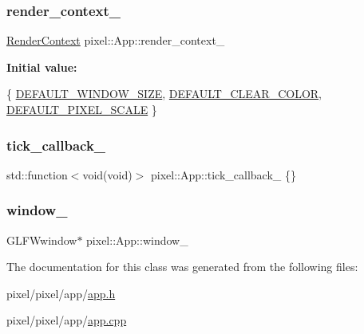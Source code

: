 \subsubsection{\texorpdfstring{render\+\_\+context\+\_\+}{render\_context\_}}
{\footnotesize\ttfamily \hyperlink{structpixel_1_1_render_context}{Render\+Context} pixel\+::\+App\+::render\+\_\+context\+\_\+\hspace{0.3cm}{\ttfamily [private]}}

{\bfseries Initial value\+:}
\begin{DoxyCode}
\{
        \hyperlink{namespacepixel_a9c38287d50c84fb5c1f25c965db0a6a5}{DEFAULT\_WINDOW\_SIZE},
        \hyperlink{namespacepixel_aa4c296a437eb1e0def40cff29b699be2}{DEFAULT\_CLEAR\_COLOR},
        \hyperlink{namespacepixel_ae08ee7e855f850855389107cb37ae167}{DEFAULT\_PIXEL\_SCALE}
    \}
\end{DoxyCode}
\mbox{\label{classpixel_1_1_app_a5648c144f79952b5c4c51acf304fb2f8}} 
\subsubsection{\texorpdfstring{tick\+\_\+callback\+\_\+}{tick\_callback\_}}
{\footnotesize\ttfamily std\+::function$<$void(void)$>$ pixel\+::\+App\+::tick\+\_\+callback\+\_\+ \{\}\hspace{0.3cm}{\ttfamily [private]}}

\mbox{\label{classpixel_1_1_app_aaec703aee9656cf040b8c9f5eb4fc3ad}} 
\subsubsection{\texorpdfstring{window\+\_\+}{window\_}}
{\footnotesize\ttfamily G\+L\+F\+Wwindow$\ast$ pixel\+::\+App\+::window\+\_\+\hspace{0.3cm}{\ttfamily [private]}}



The documentation for this class was generated from the following files\+:\begin{DoxyCompactItemize}
\item 
pixel/pixel/app/\hyperlink{app_8h}{app.\+h}\item 
pixel/pixel/app/\hyperlink{app_8cpp}{app.\+cpp}\end{DoxyCompactItemize}
